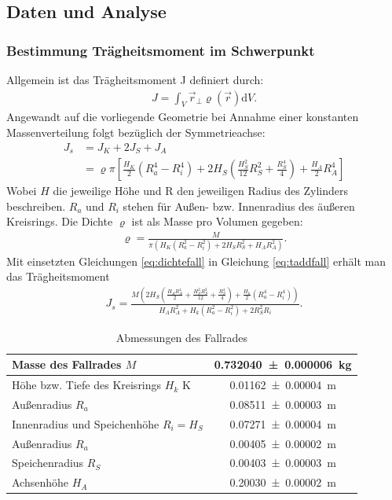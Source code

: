 \subsection{Daten und Analyse} %

\subsubsection{Bestimmung Trägheitsmoment im Schwerpunkt}

Allgemein ist das Trägheitsmoment J definiert durch:
\begin{align}
J= \int_{V} \vec{r}_{\perp} \varrho (\vec{r}) \mathrm{d}V.
\end{align}
Angewandt auf die vorliegende Geometrie bei Annahme einer konstanten Massenverteilung folgt bezüglich der Symmetrieachse: 
\begin{align}
J_s&= J_{K}+2J_{S}+J_{A}\\
&=\varrho \pi \left[\frac{H_K}{2} (R_a^4-R_i^4)+  2 H_S(\frac{H_S^2}{12} R_S^2+\frac{R_S^4}{4})+  \frac{H_A}{2}R_A^4  \right] \label{eq:taddfall}
\end{align}	
Wobei $H$ die jeweilige Höhe und R den jeweiligen Radius des Zylinders beschreiben. $R_a$ und $R_i$ stehen für Außen- bzw. Innenradius des äußeren Kreisrings. Die Dichte $\varrho$ ist als Masse pro Volumen gegeben:
\begin{align}
	\varrho=\frac{M}{\pi(H_K  (R_a^2-R_i^2)+2 H_S  R_S^2+ H_A  R_A^2)}. \label{eq:dichtefall}
\end{align} 
Mit einsetzten Gleichungen \ref{eq:dichtefall} in Gleichung \ref{eq:taddfall} erhält man das Trägheitsmoment
\begin{align}
J_s=\frac{M \left(2 H_{S} \left(\frac{H_{A} R_{A}^{4}}{2} + \frac{H_{S}^{2} R_{S}^{2}}{12} + \frac{R_{S}^{4}}{4}\right) + \frac{ H_{k}}{2} \left(R_{a}^{4} - R_{i}^{4}\right)\right)}{H_{A} R_{A}^{2} + H_{k} \left(R_{a}^{2} - R_{i}^{2}\right) + 2 R_{S}^{2} R_{i}} \label{eq:Jfall}.
\end{align}



\begin{table}
	\caption{Abmessungen des Fallrades}
	\begin{tabular}{|l|c|}
	\hline 
	Masse des Fallrades $M$& \SI{0.732040\pm 0.000006}{kg} \\ 
	\hline 
	Höhe bzw. Tiefe des Kreisrings $H_k$ K& \SI{0.01162\pm 0.00004}{m} \\ 
	\hline 
	Außenradius $R_a$ & \SI{0.08511\pm 0.00003}{m} \\ 
	\hline 
	Innenradius und Speichenhöhe $R_i=H_S$ & \SI{0.07271\pm 0.00004}{m}  \\ 
	\hline 
	Außenradius $R_a$	& \SI{0.00405 \pm 0.00002}{m} \\ 
	\hline 
	Speichenradius $R_S$& \SI{0.00403 \pm 0.00003}{m} \\ 
	\hline 
	Achsenhöhe $H_A$& \SI{0.20030\pm 0.00002}{m} \\ 
	\hline 

\end{tabular}
\label{tab:datafall} 
\end{table}



